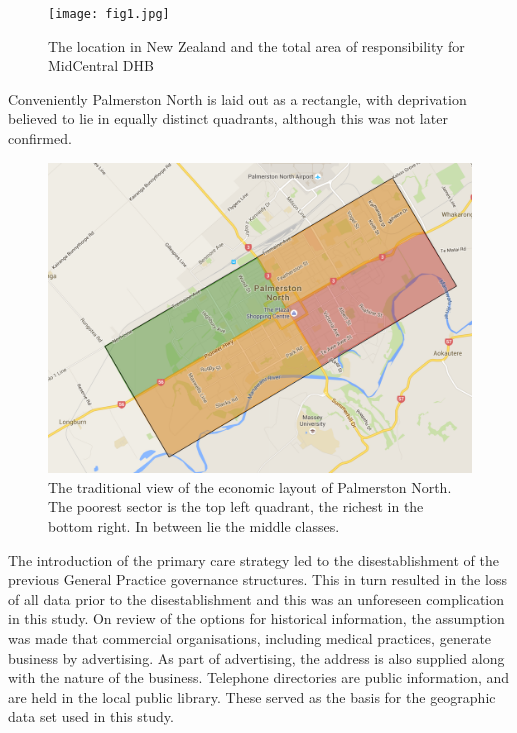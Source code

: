 \documentclass[11pt,a4paper]{article}
\begin{document}
\begin{figure}[htp]
\centering
\texttt{[image: fig1.jpg]}
\caption{The location in New Zealand and the total area of responsibility for MidCentral DHB}
\label{MidCentral District Health Board}
\end{figure}

Conveniently Palmerston North is laid out as a rectangle, with deprivation believed to lie in equally distinct quadrants, although this was not later confirmed.\\

\begin{figure}[htp]
\centering
\includegraphics[scale=0.20]{fig2.png}
\caption{The traditional view of the economic layout of Palmerston North. The poorest sector is the top left quadrant, the richest in the bottom right. In between lie the middle classes.}
\label{Traditional view of the spatial economics of Palmerston North City}
\end{figure}

The introduction of the primary care strategy led to the disestablishment of the previous General Practice governance structures. This in turn resulted in the loss of all data prior to the disestablishment and this was an unforeseen complication in this study. On review of the options for historical information, the assumption was made that commercial organisations, including medical practices, generate business by advertising. As part of advertising, the address is also supplied along with the nature of the business. Telephone directories are public information, and are held in the local public library. These served as the basis for the geographic data set used in this study.\\
\end{document}
